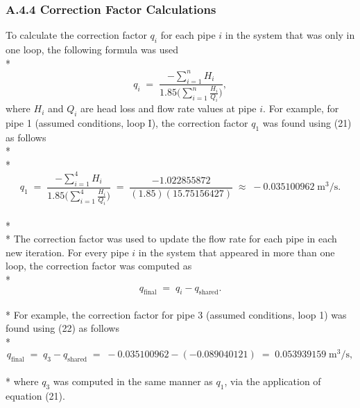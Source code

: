 \documentclass[]{article}
\begin{document}
\subsubsection{A.4.4 Correction Factor Calculations}
To calculate the correction factor $q_i$ for each pipe $i$ in the system that was only in one loop, the following formula was used \\* 
\begin{equation}
q_i \; = \; \dfrac{-\sum_{i=1}^{n} H_i}{1.85 \Bigg(\sum_{i=1}^{n} \frac{H_i}{Q_i}\Bigg)},
\end{equation}
where $H_i$ and $Q_i$ are head loss and flow rate values at pipe $i$. For example, for pipe 1 (assumed conditions, loop I), the correction factor $q_1$ was found using (21) as follows \\* \\* 
\begin{equation}
\nonumber
q_1 \; = \; \dfrac{-\sum_{i=1}^{4} H_i}{1.85 \Bigg(\sum_{i=1}^{4} \frac{H_i}{Q_i}\Bigg)} \; = \; \dfrac{-1.022855872}{(1.85)(15.75156427)} \; \approx \; -0.035100962 \; \text{m}^3/\text{s}.
\end{equation} \\* \\* 
The correction factor was used to update the flow rate for each pipe in each new iteration. For every pipe $i$ in the system that appeared in more than one loop, the correction factor was computed as \\* 
\begin{equation}
q_{\text{final}} \; = \; q_i - q_{\text{shared}}.
\end{equation} \\* 
For example, the correction factor for pipe 3 (assumed conditions, loop 1) was found using (22) as follows \\*
\begin{equation}
\nonumber
q_{\text{final}} \; = \; q_3 - q_{\text{shared}} \; = \; -0.035100962 - (-0.089040121) \; = \; 0.053939159 \; \text{m}^3/\text{s},
\end{equation} \\* 
where $q_3$ was computed in the same manner as $q_1$, via the application of equation (21).
\newpage
\end{document}
